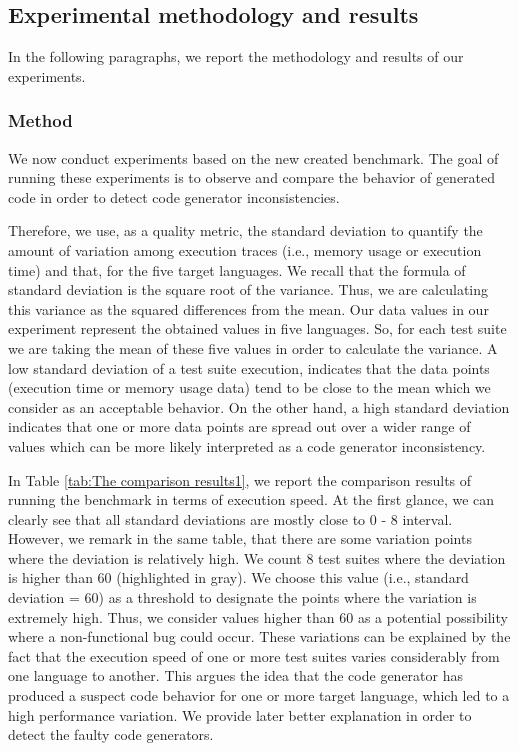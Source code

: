 \subsection{Experimental methodology and results}
In the following paragraphs, we report the methodology and results of our experiments. 




\subsubsection{Method}
We now conduct experiments based on the new created benchmark. 
The goal of running these experiments is to observe and compare the behavior of generated code in order to detect code generator inconsistencies.

 
 
Therefore, we use, as a quality metric, the standard deviation to quantify the amount of variation among execution traces (i.e., memory usage or execution time) and that, for the five target languages. We recall that the formula of standard deviation is the square root of the variance. Thus, we are calculating this variance as the squared differences from the mean. Our data values in our experiment represent the obtained values in five languages. So, for each test suite we are taking the mean of these five values in order to calculate the variance.
A low standard deviation of a test suite execution, indicates that the data points (execution time or memory usage data) tend to be close to the mean which we consider as an acceptable behavior.  
On the other hand, a high standard deviation indicates that one or more data points are spread out over a wider range of values which can be more likely interpreted as a code generator inconsistency. 

In Table \ref{tab:The comparison results1}, we report the comparison results of running the benchmark in terms of execution speed. At the first glance, we can clearly see that all standard deviations are mostly close to 0 - 8 interval. However, we remark in the same table, that there are some variation points where the deviation is relatively high. We count 8 test suites where the deviation is higher than 60 (highlighted in gray). We choose this value (i.e., standard deviation = 60) as a threshold to designate the points where the variation is extremely high. Thus, we consider values higher than 60 as a potential possibility where a non-functional bug could occur. These variations can be explained by the fact that the execution speed of one or more test suites varies considerably from one language to another. This argues the idea that the code generator has produced a suspect code behavior for one or more target language, which led to a high performance variation. We provide later better explanation in order to detect the faulty code generators.

